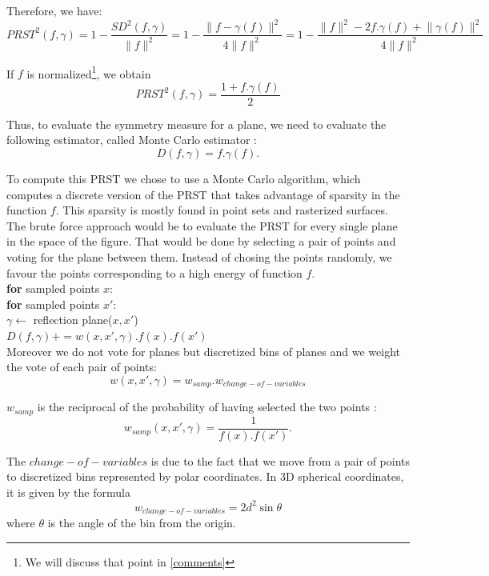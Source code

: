 \documentclass[10pt,a4paper]{article}                        %
\begin{document}
Therefore, we have:
$$ PRST^2(f,\gamma) = 1 - \frac{SD^2(f,\gamma)}{\lVert f \lVert ^2} =  1 - \frac{\lVert f - \gamma(f) \lVert ^2 }{4 \lVert f \lVert ^2}        =  1 - \frac{\lVert f \lVert ^2 - 2f.\gamma(f) + \lVert \gamma(f) \lVert ^2 }{4 \lVert f \lVert ^2} $$

If $f$ is normalized\footnote{We will discuss that point in \ref{comments}}, we obtain
\begin{equation}
PRST^2(f,\gamma) = \frac{1 + f.\gamma(f)}{2}
\label{equation_simplifiee}
\end{equation}

        Thus, to evaluate the symmetry measure for a plane, we need to evaluate the following estimator, called Monte Carlo estimator :
$$ D(f,\gamma) = f.\gamma(f). $$
        
        To compute this PRST we chose to use a Monte Carlo algorithm, which computes a discrete version of the PRST that takes advantage of sparsity in the function $f$. This sparsity is mostly found in  point sets and rasterized surfaces.
        The brute force approach would be to evaluate the PRST for every single plane in the space of the figure. That would be done by selecting a pair of points and voting for the plane between them. Instead of chosing the points randomly, we favour the points corresponding to a high energy of function $f$.\\
        

\indent \indent \textbf{for} sampled points $x$:\\
\indent \indent \indent \textbf{for} sampled points $x'$: \\
\indent \indent \indent \indent $\gamma \leftarrow$ reflection plane($x, x'$)\\
\indent \indent \indent \indent $D(f,\gamma) += w(x, x',\gamma).f(x).f(x')$\\
        
Moreover we do not vote for planes but discretized bins of planes and we weight the vote of each pair of points:
$$ w(x, x',\gamma) = w_{samp} . w_{change-of-variables} $$

$w_{samp}$ is the reciprocal of the probability of having selected the two points :
$$w_{samp}(x, x',\gamma) = \frac{1}{f(x).f(x')}. $$

The $change-of-variables$ is due to the fact that we move from a pair of points to discretized bins represented by polar coordinates. In 3D spherical coordinates, it is given by the formula \[w_{change-of-variables} = 2d^2\sin\theta\]
where $\theta$ is the angle of the bin from the origin.\\
\end{document}
